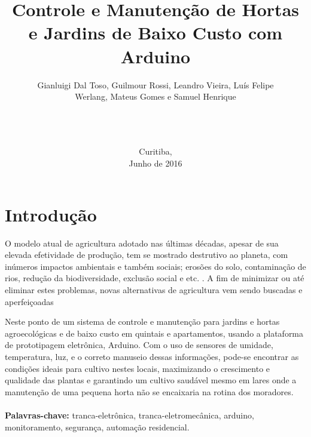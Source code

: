 \documentclass[a4paper,12pt]{article}
\begin{document}
\title{Controle e Manutenção de Hortas e Jardins de Baixo Custo com Arduino}
\author{Gianluigi Dal Toso, Guilmour Rossi, Leandro Vieira, Luís Felipe\\Werlang, Mateus Gomes e Samuel Henrique\\\texttt{}\\\\\\
}

\date{Curitiba, \\Junho de 2016}

\maketitle

\newpage


\tableofcontents


\newpage

\listoffigures

\newpage

\listoftables

\makenomenclature

\newpage
\section{Introdução}

	O modelo atual de agricultura adotado nas últimas décadas, apesar de sua elevada efetividade de produção, tem se mostrado destrutivo ao planeta, com inúmeros impactos ambientais e também sociais; erosões do solo, contaminação de rios, redução da biodiversidade, exclusão social e etc. \cite[p.~23]{medeiros}. A fim de minimizar ou até eliminar estes problemas, novas alternativas de agricultura vem sendo buscadas e aperfeiçoadas

Neste ponto  de um sistema de controle e manutenção para jardins e hortas agroecológicas e de baixo custo em quintais e apartamentos, usando a plataforma de prototipagem eletrônica, Arduino. Com o uso de sensores de umidade, temperatura, luz, e o correto manuseio dessas informações, pode-se encontrar as condições ideais para cultivo nestes locais, maximizando o crescimento e qualidade das plantas e garantindo um cultivo saudável mesmo em lares onde a manutenção de uma pequena horta não se encaixaria na rotina dos moradores.
  \textbf{\\\\Palavras-chave:} tranca-eletrônica, tranca-eletromecânica, arduino, monitoramento, segurança, automação residencial.
\end{document}
